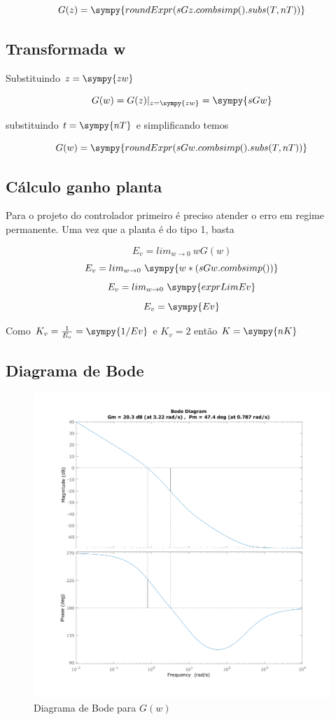 \documentclass[a4paper,11pt]{article}
\begin{document}
\begin{equation}
    G(z) = \sympy{roundExpr(sGz.combsimp().subs(T,nT))}
\end{equation}

\subsection{Transformada w}

Substituindo $z = \sympy{zw}$

$$
G(w) = G(z)|_{z=\sympy{zw}} = \sympy{sGw}
$$

substituindo $t = \sympy{nT}$ e simplificando temos

\begin{equation}
    G(w) = \sympy{roundExpr(sGw.combsimp().subs(T,nT))}
\end{equation}

\subsection{Cálculo ganho planta}

Para o projeto do controlador primeiro é preciso atender o erro em regime permanente. Uma vez que a planta é do tipo 1, basta 

$$E_v = lim_{w \rightarrow 0}\ w G(w)$$
$$E_v = lim_{w \rightarrow 0}\  \sympy{w*(sGw.combsimp())}$$
$$E_v = lim_{w \rightarrow 0}\  \sympy{exprLimEv}$$
$$E_v = \sympy{Ev}$$

Como $K_v = \frac{1}{E_v} = \sympy{1/Ev}$  e $K_v = 2$ então $K = \sympy{nK}$

\subsection{Diagrama de Bode}

\begin{figure}[H]
    \centering
    \includegraphics[width=0.8\linewidth]{img/exsim4-bodeplot-gw.png}
    \caption{Diagrama de Bode para $G(w)$}
\end{figure}
\end{document}
